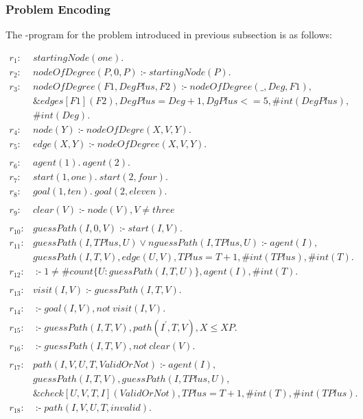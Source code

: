 \documentclass[a4paper, titlepage]{article}
\newcommand{\ext}[3]{\ensuremath{\&{#1}[#2](#3)}}
\DeclareMathOperator{\leftimpl}{:-}
\begin{document}
\subsubsection{Problem Encoding}
The \hex-program for the problem introduced in previous 
subsection is as follows:
\begin{exmp}
\label{pathfindingAgent}
\begin{align*}
r_1 \colon & startingNode(one). \\
r_2 \colon & nodeOfDegree(P,0,P) \leftimpl startingNode(P). 
\\
r_3 \colon & nodeOfDegree(F1, DegPlus, F2) \leftimpl 
nodeOfDegree(\_, Deg, F1), \\ & \ext{edges}{F1}{F2}, 
DegPlus=Deg+1, DgPlus <= 5, \#int(DegPlus), \\ &\#int(Deg). 
\\
r_4 \colon & node(Y) \leftimpl nodeOfDegre(X, V, Y).  \\
r_5 \colon & edge(X,Y) \leftimpl nodeOfDegree(X,V,Y).\\
\\
r_6 \colon &  \mathit{agent(1). } \ \mathit{ agent(2). }\\
r_7 \colon & \mathit{start(1,one).} \ \mathit{ 
start(2,four).} \\
r_8 \colon & \mathit{goal(1,ten).} \ \mathit{ 
goal(2,eleven).} \\
\\
r_9 \colon & clear(V) \leftimpl \mathit{node(V)}, V \neq 
\mathit{three}\\ 
\\
r_{10} \colon & guessPath(I,0,V) \leftimpl start(I,V). \\
r_{11} \colon &  \mathit{guessPath(I, TPlus, U)} \vee 
\mathit{nguessPath(I, TPlus, U)} \leftimpl 
\mathit{agent(I)}, \\ &  \mathit{guessPath(I, T, V)},  
\mathit{edge(U,V)}, \mathit{TPlus=T+1}, 
\mathit{\#int(TPlus)}, \mathit{\#int(T).}  \\
r_{12} \colon &  \leftimpl 1 \neq \mathit{\#count\{ U 
\colon guessPath(I, T, U) \}}, \mathit{agent(I)}, 
\mathit{\#int(T)}.  \\
\\
r_{13} \colon &  visit(I, V) \leftimpl guessPath(I,T,V). \\
\\
r_{14} \colon & \leftimpl goal(I, V), \mathit{not} \  
\mathit{visit(I, V).} \\
r_{15} \colon &  \leftimpl guessPath(I, T, V), 
path(I^{\prime},T,V), X \leq XP. \\
r_{16} \colon &  \leftimpl guessPath(I,T,V), \mathit{not} \  
\mathit{clear(V).}\\
\\
r_{17} \colon &  \mathit{path(I,V,U,T,ValidOrNot)} 
\leftimpl \mathit{agent(I)}, \\ & \mathit{guessPath(I, T, 
V)}, \mathit{guessPath(I, TPlus, U)}, \\ & \ext{check}{U, 
V, T, I}{ValidOrNot}, \mathit{TPlus=T+1}, \#int(T), 
\#int(TPlus).  \\
r_{18} \colon & \leftimpl path(I, V, U, T, invalid). 
\end{align*}
\end{exmp}
\end{document}
